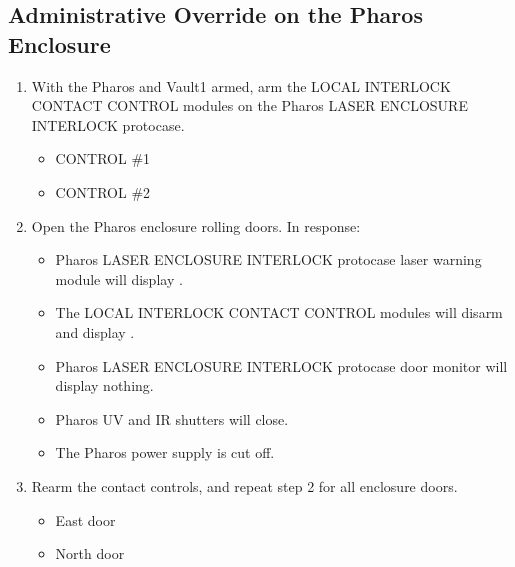 \documentclass[letterpaper,10pt,english]{sphinxmanual}
\begin{document}
\subsection{Administrative Override on the Pharos Enclosure}
\label{\detokenize{testing_documentation/Vault-1_laser:administrative-override-on-the-pharos-enclosure}}\begin{enumerate}
%
\item {} 
\sphinxAtStartPar
With the Pharos and Vault\sphinxhyphen{}1 armed, arm the LOCAL INTERLOCK CONTACT CONTROL modules on the Pharos LASER ENCLOSURE INTERLOCK protocase.
\begin{itemize}
\item {} 
\sphinxAtStartPar
CONTROL \#1

\item {} 
\sphinxAtStartPar
CONTROL \#2

\end{itemize}

\item {} 
\sphinxAtStartPar
Open the Pharos enclosure rolling doors. In response:
\begin{itemize}
\item {} 
\sphinxAtStartPar
Pharos LASER ENCLOSURE INTERLOCK protocase laser warning module will display .

\item {} 
\sphinxAtStartPar
The LOCAL INTERLOCK CONTACT CONTROL modules will disarm and display .

\item {} 
\sphinxAtStartPar
Pharos LASER ENCLOSURE INTERLOCK protocase door monitor will display nothing.

\item {} 
\sphinxAtStartPar
Pharos UV and IR shutters will close.

\item {} 
\sphinxAtStartPar
The Pharos power supply is cut off.

\end{itemize}

\item {} 
\sphinxAtStartPar
Rearm the contact controls, and repeat step 2 for all enclosure doors.
\begin{itemize}
\item {} 
\sphinxAtStartPar
East door

\item {} 
\sphinxAtStartPar
North door


\end{itemize}
\end{enumerate}
\end{document}
